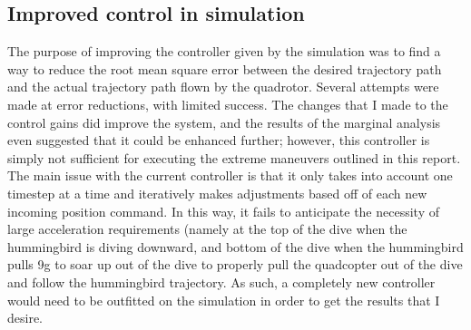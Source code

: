 \subsection{Improved control in simulation}
The purpose of improving the controller given by the simulation was to find a way to reduce the root mean square error between the desired trajectory path and the actual trajectory path flown by the quadrotor. Several attempts were made at error reductions, with limited success. The changes that I made to the control gains did improve the system, and the results of the marginal analysis even suggested that it could be enhanced further; however, this controller is simply not sufficient for executing the extreme maneuvers outlined in this report. The main issue with the current controller is that it only takes into account one timestep at a time and iteratively makes adjustments based off of each new incoming position command. In this way, it fails to anticipate the necessity of large acceleration requirements (namely at the top of the dive when the hummingbird is diving downward, and bottom of the dive when the hummingbird pulls 9g to soar up out of the dive \cite{clark2009courtship} to properly pull the quadcopter out of the dive and follow the hummingbird trajectory. As such, a completely new controller would need to be outfitted on the simulation in order to get the results that I desire.




